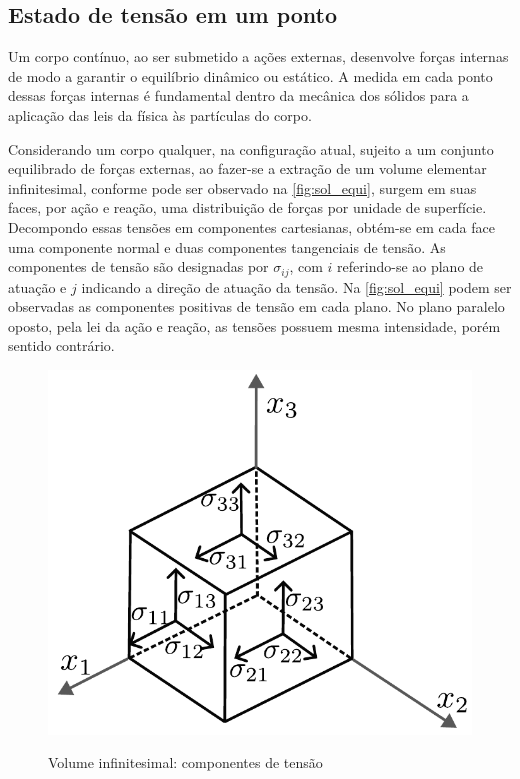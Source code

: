 \subsection{Estado de tensão em um ponto}

Um corpo contínuo, ao ser submetido a ações externas, desenvolve forças internas de modo a garantir o equilíbrio dinâmico ou estático. A medida em cada ponto dessas forças internas é fundamental dentro da mecânica dos sólidos para a aplicação das leis da física às partículas do corpo.

Considerando um corpo qualquer, na configuração atual, sujeito a um conjunto equilibrado de forças externas, ao fazer-se a extração de um volume elementar infinitesimal, conforme pode ser observado na \autoref{fig:sol_equi}, surgem em suas faces, por ação e reação, uma distribuição de forças por unidade de superfície. Decompondo essas tensões em componentes cartesianas, obtém-se em cada face uma componente normal e duas componentes tangenciais de tensão. As componentes de tensão são designadas por $\sigma_{ij}$, com $i$ referindo-se ao plano de atuação e $j$ indicando a direção de atuação da tensão. Na \autoref{fig:sol_equi} podem ser observadas as componentes positivas de tensão em cada plano. No plano paralelo oposto, pela lei da ação e reação, as tensões possuem mesma intensidade, porém sentido contrário.

\begin{figure}[!htbp]
	\caption{Volume infinitesimal: componentes de tensão}
	\centering
	\includegraphics[scale=0.5,trim=0cm 0.0cm 0cm 0cm, clip=true]{Imagens/Cap4/sol_vol_equi.pdf}	
	\label{fig:sol_equi}
\end{figure}

